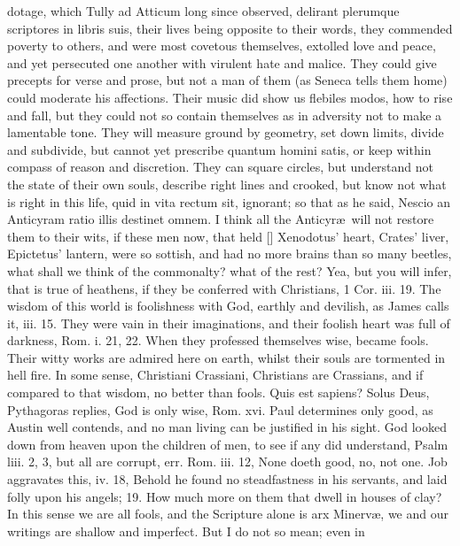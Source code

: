 {dotage, which Tully ad Atticum long since observed, delirant plerumque
scriptores in libris suis, their lives being opposite to their words,
they commended poverty to others, and were most covetous themselves,
extolled love and peace, and yet persecuted one another with virulent
hate and malice. They could give precepts for verse and prose, but not
a man of them (as Seneca tells them home) could moderate his
affections. Their music did show us flebiles modos, \etc how to rise and
fall, but they could not so contain themselves as in adversity not to
make a lamentable tone. They will measure ground by geometry, set down
limits, divide and subdivide, but cannot yet prescribe quantum homini
satis, or keep within compass of reason and discretion. They can square
circles, but understand not the state of their own souls, describe
right lines and crooked, \etc but know not what is right in this life,
quid in vita rectum sit, ignorant; so that as he said, Nescio an
Anticyram ratio illis destinet omnem. I think all the Anticyr\ae{}\ will
not restore them to their wits, if these men now, that held [\baselineskip]
Xenodotus' heart, Crates' liver, Epictetus' lantern, were so sottish,
and had no more brains than so many beetles, what shall we think of the
commonalty? what of the rest?
Yea, but you will infer, that is true of heathens, if they be conferred
with Christians, 1 Cor. iii. 19. The wisdom of this world is
foolishness with God, earthly and devilish, as James calls it, iii. 15.
They were vain in their imaginations, and their foolish heart was full
of darkness, Rom. i. 21, 22. When they professed themselves wise,
became fools. Their witty works are admired here on earth, whilst their
souls are tormented in hell fire. In some sense, Christiani Crassiani,
Christians are Crassians, and if compared to that wisdom, no better
than fools. Quis est sapiens? Solus Deus, Pythagoras replies, God
is only wise, Rom. xvi. Paul determines only good, as Austin well
contends, and no man living can be justified in his sight. God looked
down from heaven upon the children of men, to see if any did
understand, Psalm liii. 2, 3, but all are corrupt, err. Rom. iii. 12,
None doeth good, no, not one. Job aggravates this, iv. 18, Behold he
found no steadfastness in his servants, and laid folly upon his angels;
19. How much more on them that dwell in houses of clay? In this sense
we are all fools, and the Scripture alone is arx Minerv\ae{}, we and
our writings are shallow and imperfect. But I do not so mean; even in
}
